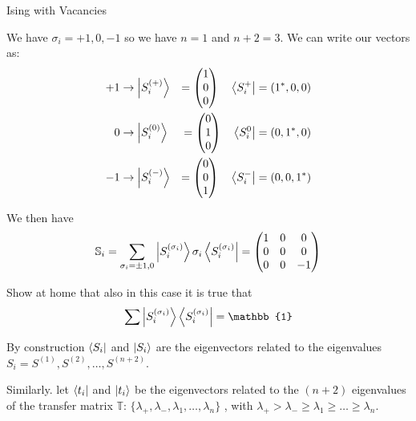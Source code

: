 \documentclass[../../Main/Main.tex]{subfiles}
\begin{document}
\begin{example}{Ising with Vacancies}{}

We have $\sigma_{i} = +1,0,-1$ so we have $n=1$ and $n+2 = 3$.
We can write our vectors as:
$$
\begin{align}
+&1 \to \ket{S_{i}^{(+)}}  &= \begin{pmatrix}
1 \\
0 \\
0
\end{pmatrix}\quad  \bra{S_{i}^{+}} = (1^{*},0,0) \\
&0 \to \ket{S_{i}^{(0)}}  &= \begin{pmatrix}
0 \\
1 \\
0
\end{pmatrix}  \quad \bra{S_{i}^{0}} = (0,1^{*},0)\\
-&1 \to \ket{S_{i}^{(-)}}  &= \begin{pmatrix}
0 \\
0 \\
1
\end{pmatrix} \quad \bra{S_{i}^{-}} = (0,0,1^{*})\\
\end{align}
$$

We then have
$$\mathbb{S}_{i} = \sum_{\sigma_{i} = \pm 1,0} \ket{S_{i}^{(\sigma_{i})}} \sigma_{i}\bra{S_{i}^{(\sigma_{i})}} = \begin{pmatrix}
1 & 0 & 0 \\
0 & 0 & 0 \\
0 & 0 & -1
\end{pmatrix} $$

Show at home that also in this case it is true that
$$\sum \ket{S_{i}^{(\sigma_{i})}} \bra{S_{i}^{(\sigma_{i})}} = \mathbb{1}$$

\end{example}



\begin{remark}
By construction \( \bra{S_i}  \) and \( \ket{S_i}  \) are the eigenvectors related to the eigenvalues \( S_i = S^{(1)},S^{(2)}, \dots,S^{(n+2)} \).
\end{remark}
Similarly. let \( \bra{t_i}  \) and \( \ket{t_i}  \) be the eigenvectors related to the \( (n+2) \) eigenvalues of the transfer matrix \( \mathbb{T} \):
   \( \{ \lambda _+,\lambda _-,\lambda _1,\dots,\lambda _n  \}   \) , with \( \lambda _+ > \lambda _- \ge \lambda _1 \ge \dots \ge \lambda _n \).
\end{document}
